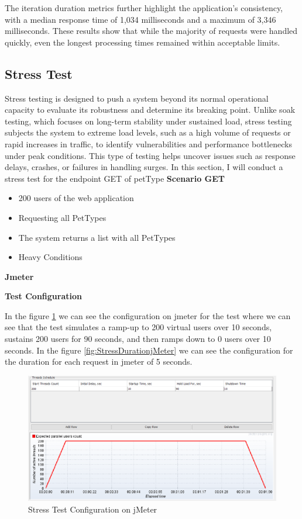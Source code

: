 \documentclass[a4paper,11pt,openright,BCOR=15mm]{scrbook}
\begin{document}
The iteration duration metrics further highlight the application's consistency, with a median response time of 1,034 milliseconds and a maximum of 3,346 milliseconds. These results show that while the majority of requests were handled quickly, even the longest processing times remained within acceptable limits.

\subsection{Stress Test}
		
Stress testing is designed to push a system beyond its normal operational capacity to evaluate its robustness and determine its breaking point. Unlike soak testing, which focuses on long-term stability under sustained load, stress testing subjects the system to extreme load levels, such as a high volume of requests or rapid increases in traffic, to identify vulnerabilities and performance bottlenecks under peak conditions. This type of testing helps uncover issues such as response delays, crashes, or failures in handling surges. In this section, I will conduct a stress test for the endpoint GET of petType
\textbf{Scenario GET}
\begin{itemize}
	\item 200 users of the web application
	\item Requesting all PetTypes
	\item The system returns a list with all PetTypes
	\item Heavy Conditions
\end{itemize}


\textbf{Jmeter}



\textbf{Test Configuration}



In the figure \ref{fig:StressConfigurationjMeter} we can see the configuration on jmeter for the test where we can see that the test simulates a ramp-up to 200 virtual users over 10 seconds, sustains 200 users for 90 seconds, and then ramps down to 0 users over 10 seconds. In the figure \ref{fig:StressDurationjMeter} we can see the configuration for the duration for each request in jmeter of 5 seconds.



\begin{figure}[H]
	\centering
	\includegraphics[width=\textwidth]{figs/Performance/jmeter/StressJmeterConfiguration.png}
	\caption{Stress Test Configuration on jMeter}
	\label{fig:StressConfigurationjMeter}
\end{figure}
\end{document}
